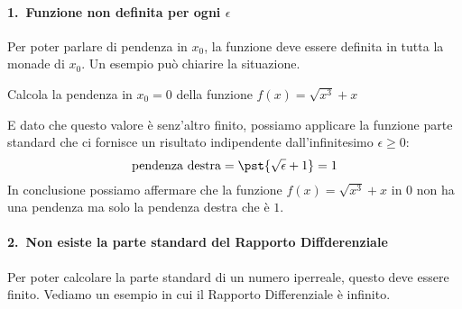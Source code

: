 \paragraph{1.~Funzione non definita per ogni \(\epsilon\)}

Per poter parlare di pendenza in  \(x_0\), la funzione deve essere 
definita in tutta la monade di \(x_0\).
Un esempio può chiarire la situazione.

\begin{esempio}
Calcola la pendenza in \(x_0 = 0\) della funzione \(f(x) = \sqrt{x^3}+x\)

E dato che questo valore è senz'altro finito, possiamo applicare la 
funzione parte standard che ci fornisce un risultato indipendente 
dall'infinitesimo \(\epsilon \geqslant 0\):
\[\text{pendenza destra} = \pst{\sqrt{\epsilon} + 1} = 1\]
In conclusione possiamo affermare che la funzione \(f(x) = \sqrt{x^3}+x\) 
in \(0\) non ha una pendenza ma solo la pendenza destra che è \(1\).
\end{esempio}

\paragraph{2.~Non esiste la parte standard del Rapporto Diffderenziale}

Per poter calcolare la parte standard di un numero iperreale, questo 
deve essere finito. 
Vediamo un esempio in cui il Rapporto Differenziale è infinito.

